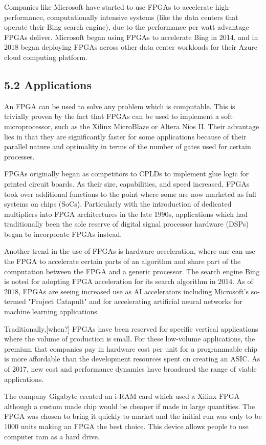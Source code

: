 Companies like Microsoft have started to use FPGAs to accelerate high-performance, computationally intensive systems (like the data centers that operate their Bing search engine), due to the performance per watt advantage FPGAs deliver. Microsoft began using FPGAs to accelerate Bing in 2014, and in 2018 began deploying FPGAs across other data center workloads for their Azure cloud computing platform.\vspace{.3cm}

\subsection*{5.2 Applications}
An FPGA can be used to solve any problem which is computable. This is trivially proven by the fact that FPGAs can be used to implement a soft microprocessor, such as the Xilinx MicroBlaze or Altera Nios II. Their advantage lies in that they are significantly faster for some applications because of their parallel nature and optimality in terms of the number of gates used for certain processes.\vspace{.3cm}

FPGAs originally began as competitors to CPLDs to implement glue logic for printed circuit boards. As their size, capabilities, and speed increased, FPGAs took over additional functions to the point where some are now marketed as full systems on chips (SoCs). Particularly with the introduction of dedicated multipliers into FPGA architectures in the late 1990s, applications which had traditionally been the sole reserve of digital signal processor hardware (DSPs) began to incorporate FPGAs instead.\vspace{.3cm}

Another trend in the use of FPGAs is hardware acceleration, where one can use the FPGA to accelerate certain parts of an algorithm and share part of the computation between the FPGA and a generic processor. The search engine Bing is noted for adopting FPGA acceleration for its search algorithm in 2014. As of 2018, FPGAs are seeing increased use as AI accelerators including Microsoft's so-termed "Project Catapult" and for accelerating artificial neural networks for machine learning applications.\vspace{.3cm}

Traditionally,[when?] FPGAs have been reserved for specific vertical applications where the volume of production is small. For these low-volume applications, the premium that companies pay in hardware cost per unit for a programmable chip is more affordable than the development resources spent on creating an ASIC. As of 2017, new cost and performance dynamics have broadened the range of viable applications.\vspace{.3cm}

The company Gigabyte created an i-RAM card which used a Xilinx FPGA although a custom made chip would be cheaper if made in large quantities. The FPGA was chosen to bring it quickly to market and the initial run was only to be 1000 units making an FPGA the best choice. This device allows people to use computer ram as a hard drive.\vspace{.3cm}